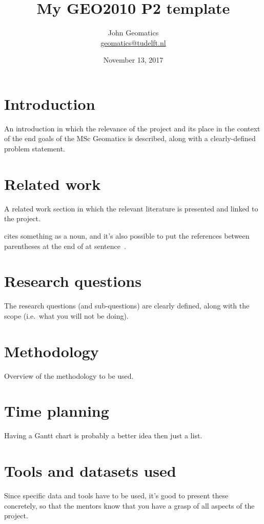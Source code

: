 \documentclass[a4paper,11pt]{scrartcl}
\title{My GEO2010 P2 template}
\author{John Geomatics\\ \url{geomatics@tudelft.nl}}
\date{November 13, 2017}
\newcommand{\ie}{i.e.}
\begin{document}
\maketitle


%
\section{Introduction}
An introduction in which the relevance of the project and its place in the context of the end goals of the MSc Geomatics is described, along with a clearly-defined problem statement.

%
\section{Related work}
A related work section in which the relevant literature is presented and linked to the project.

\citet{Delaunay34} cites something as a noun, and it's also possible to put the references between parentheses at the end of at sentence~\citep{Voronoi08}.

%
\section{Research questions}
The research questions (and sub-questions) are clearly defined, along with the scope (\ie\ what you will not be doing).


%
\section{Methodology}
Overview of the methodology to be used.

%
\section{Time planning}
Having a Gantt chart is probably a better idea then just a list.

%
\section{Tools and datasets used}
Since specific data and tools have to be used, it’s good to present these concretely, so that the mentors know that you have a grasp of all aspects of the project.




\end{document}
